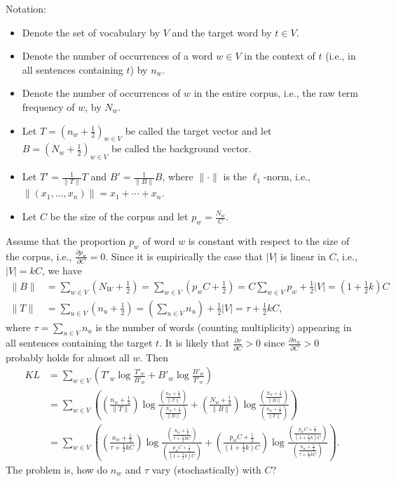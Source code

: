 \documentclass[12pt]{article}
\newcommand\prn[1]{\left( #1 \right)}
\begin{document}
Notation:
\begin{itemize}
    \item Denote the set of vocabulary by $V$ and the target word by $t\in V$.
    \item Denote the number of occurrences of a word $w\in V$ in the context of $t$ (i.e., in all sentences containing $t$) by $n_w$.
    \item Denote the number of occurrences of $w$ in the entire corpus, i.e., the raw term frequency of $w$, by $N_w$.
    \item Let $T=\prn{n_w+\frac12}_{w\in V}$ be called the target vector and let $B=\prn{N_w+\frac12}_{w\in V}$ be called the background vector.
    \item Let $T'=\frac{1}{\|T\|}T$ and $B'=\frac{1}{\|B\|}B$, where $\|\cdot\|$ is the $\ell_1$-norm, i.e., $\|(x_1,\ldots,x_n)\|=x_1+\cdots+x_n$.
    \item Let $C$ be the size of the corpus and let $p_w=\frac{N_w}{C}$.
\end{itemize}

Assume that the proportion $p_w$ of word $w$ is constant with respect to the size of the corpus, i.e., $\frac{\partial p_w}{\partial C}=0$.
Since it is empirically the case that $|V|$ is linear in $C$, i.e., $|V|=kC$, we have
\begin{align*}
\|B\|
&=\sum_{w\in V}\prn{N_W+\frac12}
=\sum_{w\in V}\prn{p_wC+\frac12}
=C\sum_{w\in V}p_w+\frac12|V|
=\prn{1+\frac12k}C\\
\|T\|
&=\sum_{u\in V}\prn{n_u+\frac12}
=\prn{\sum_{u\in V}n_u}+\frac12|V|
=\tau+\frac12kC,
\end{align*}
where $\tau=\sum_{u\in V}n_u$ is the number of words (counting multiplicity) appearing in all sentences containing the target $t$. 
It is likely that $\frac{\partial\tau}{\partial C}>0$ since $\frac{\partial n_w}{\partial C}>0$ probably holds for almost all $w$.
Then
\begin{align*}
    KL
    &=\sum_{w\in V}\prn{T'_w\log\frac{T'_w}{B'_w}+B'_w\log\frac{B'_w}{T'_w}}\\
    &=\sum_{w\in V}\prn{\prn{\frac{n_w+\frac12}{\|T\|}}\log\frac{\prn{\frac{n_w+\frac12}{\|T\|}}}{\prn{\frac{N_w+\frac12}{\|B\|}}}+\prn{\frac{N_w+\frac12}{\|B\|}}\log\frac{\prn{\frac{N_w+\frac12}{\|B\|}}}{\prn{\frac{n_w+\frac12}{\|T\|}}}}\\
    &=\sum_{w\in V}\prn{\prn{\frac{n_w+\frac12}{\tau+\frac12kC}}\log\frac{\prn{\frac{n_w+\frac12}{\tau+\frac12kC}}}{\prn{\frac{p_wC+\frac12}{\prn{1+\frac12k}C}}}+\prn{\frac{p_wC+\frac12}{\prn{1+\frac12k}C}}\log\frac{\prn{\frac{p_wC+\frac12}{\prn{1+\frac12k}C}}}{\prn{\frac{n_w+\frac12}{\tau+\frac12kC}}}}.
\end{align*}
The problem is, how do $n_w$ and $\tau$ vary (stochastically) with $C$?
\end{document}

